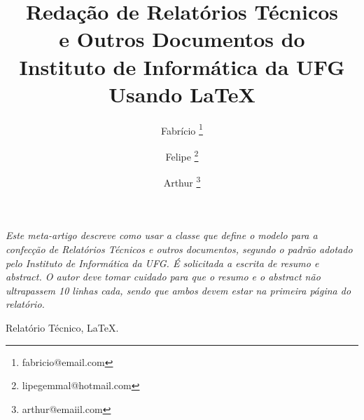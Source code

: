 \documentclass[a4paper, 12pt]{article}
\makeatletter
\newenvironment{resumo}{%
  \list{}{%
    \leftmargin=0.8cm
    \labelwidth=\z@
    \listparindent=\z@
    \itemindent\listparindent
    \rightmargin\leftmargin}\item[\hskip\labelsep
  \bfseries\itshape Resumo.]\itshape}%
{\endlist}
\newenvironment{palavras-chave}{%
  \list{}{%
    \leftmargin=0.8cm
    \labelwidth=\z@
    \listparindent=\z@
    \itemindent\listparindent
    \rightmargin\leftmargin}\item[\hskip\labelsep
  \bfseries Palavras-Chave:]}%
{\endlist}
\makeatother
\begin{document}
%
\title{\bf Redação de Relatórios Técnicos \\e Outros Documentos do
  \\ Instituto de Informática da UFG Usando \LaTeX}

\author{Fabrício \thanks{fabricio@email.com} \and
  Felipe \thanks{lipegemmal@hotmail.com} \and
  Arthur \thanks{arthur@emaiil.com}}
\date{}

\maketitle






\begin{resumo} 
Este meta-artigo descreve como usar a classe que define o modelo para a confecção de Relatórios Técnicos e outros documentos, segundo o padrão adotado pelo Instituto de Informática da UFG. É solicitada a escrita de resumo e \textit{abstract}. O autor deve tomar cuidado para que o resumo e o \textit{abstract} não ultrapassem 10 linhas cada, sendo que ambos devem estar na primeira página do relatório.
\end{resumo}

\begin{palavras-chave}
Relatório Técnico, \LaTeX.
\end{palavras-chave}






% 
\end{document}
